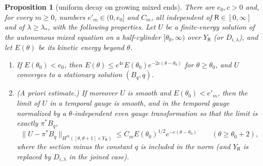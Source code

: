 \documentclass[11pt]{amsart}
\newtheorem{proposition}[theorem]{Proposition}
\theoremstyle{definition}
\theoremstyle{remark}
\theoremstyle{plain}
\numberwithin{equation}{section}
\begin{document}
\begin{proposition}[uniform decay on growing mixed ends]\label{prop:growing-ends}
There are $e_0,c>0$ and, for every $m\ge0$, numbers $e'_m\in(0,e_0]$ and $C_m$, all
independent of $\mathsf R\in[0,\infty]$ and of $\lambda\ge\lambda_*$, with the following
properties. Let $U$ be a finite-energy solution of the autonomous mixed equation on a
half-cylinder $[\theta_0,\infty)$ over $Y_\mathsf R$ (or $D_{i,\lambda}$), and let $E(\theta)$ be its
kinetic energy beyond $\theta$.
\begin{enumerate}[label=(\roman*)]
\item If $E(\theta_0)<e_0$, then $E(\theta)\le e^{4c}E(\theta_0)e^{-2c(\theta-\theta_0)}$ for
  $\theta\ge\theta_0$, and $U$ converges to a stationary solution $(B_q,q)$.
\item (A priori estimate.) If moreover $U$ is smooth and $E(\theta_0)<e'_m$, then the limit of
  $U$ in a temporal gauge is smooth, and in the temporal gauge normalized by a
  $\theta$-independent even gauge transformation so that the limit is exactly $\pi^*B_q$,
  \begin{equation}\label{eq:end-decay}
  \|U-\pi^*B_q\|_{H^m([\theta,\theta+1]\times Y_\mathsf R)}\le C_mE(\theta_0)^{1/2}e^{-c(\theta-\theta_0)}
  \qquad(\theta\ge\theta_0+2),
  \end{equation}
  where the section minus the constant $q$ is included in the norm (and $Y_\mathsf R$ is
  replaced by $D_{i,\lambda}$ in the joined case).
\end{enumerate}
\end{proposition}
\end{document}
